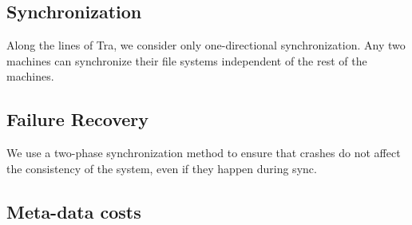 \subsection{Synchronization}
Along the lines of Tra, we consider only one-directional synchronization. Any two machines can synchronize their file systems independent of the rest of the machines.

\subsection{Failure Recovery} \label{subsec:failure}
We use a two-phase synchronization method to ensure that crashes do not affect the consistency of the system, even if they happen during sync.

\subsection{Meta-data costs}
